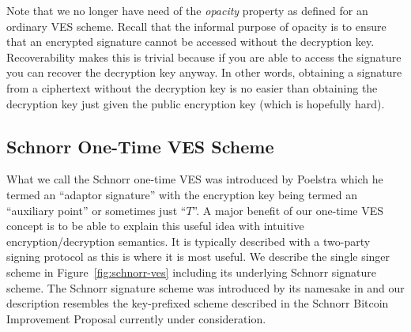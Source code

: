 \documentclass[fullpage]{article}
\theoremstyle{definition}
\begin{document}
Note that we no longer have need of the \emph{opacity} property as defined for an ordinary VES scheme. Recall that the informal purpose of opacity is to ensure that an encrypted signature cannot be accessed without the decryption key. Recoverability makes this is trivial because if you are able to access the signature you can recover the decryption key anyway. In other words, obtaining a signature from a ciphertext without the decryption key is no easier than obtaining the decryption key just given the public encryption key (which is hopefully hard).

\subsection{Schnorr One-Time VES Scheme}
What we call the Schnorr one-time VES was introduced by Poelstra \cite{poelstra2017scriptless} which he termed an ``adaptor signature''\cite{poelstra-adaptor} with the encryption key being termed an ``auxiliary point''\cite{blind-tumbler} or sometimes just ``$T$''. A major benefit of our one-time VES concept is to be able to explain this useful idea with intuitive encryption/decryption semantics. It is typically described with a two-party signing protocol as this is where it is most useful. We describe the single singer scheme in Figure~\ref{fig:schnorr-ves} including its underlying Schnorr signature scheme. The Schnorr signature scheme was introduced by its namesake in \cite{Schnorr:1989:EIS:646754.705037} and our description resembles the key-prefixed scheme described in the Schnorr Bitcoin Improvement Proposal\cite{bip-schnorr} currently under consideration.
\end{document}
